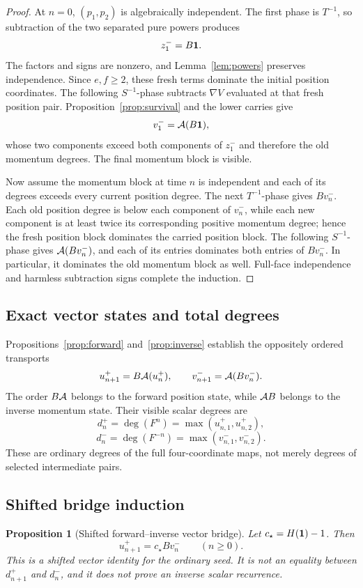 \documentclass[11pt]{article}
\newtheorem{proposition}[theorem]{Proposition}
\theoremstyle{definition}
\theoremstyle{remark}
\begin{document}
\begin{proof}
At \(n=0\), \((p_1,p_2)\) is algebraically independent.  The first
phase is \(T^{-1}\), so subtraction of the two separated pure powers
produces
\[
z^-_1=B\mathbf{1}.
\]
The factors and signs are nonzero, and Lemma~\ref{lem:powers} preserves
independence.  Since \(e,f\geq2\), these fresh terms dominate the initial
position coordinates.  The following \(S^{-1}\)-phase subtracts
\(\nabla V\) evaluated at that fresh position pair.
Proposition~\ref{prop:survival} and the lower carries give
\[
v^-_1=\mathcal{A}(B\mathbf{1}),
\]
whose two components exceed both components of \(z^-_1\) and therefore
the old momentum degrees.  The final momentum block is visible.

Now assume the momentum block at time \(n\) is independent and each of
its degrees exceeds every current position degree.  The next
\(T^{-1}\)-phase gives \(Bv^-_n\).  Each old position degree is below
each component of \(v_n^-\), while each new component is at least twice
its corresponding positive momentum degree; hence the fresh position
block dominates the carried position block.  The following
\(S^{-1}\)-phase gives \(\mathcal{A}(Bv^-_n)\), and each of its entries
dominates both entries of \(Bv^-_n\).  In particular, it dominates the
old momentum block as well.  Full-face independence and harmless
subtraction signs complete the induction.
\end{proof}

\subsection{Exact vector states and total degrees}

Propositions~\ref{prop:forward} and~\ref{prop:inverse} establish the
oppositely ordered transports
\[
u^+_{n+1}=B\mathcal{A}(u^+_n),\qquad
v^-_{n+1}=\mathcal{A}(Bv^-_n).
\]
The order \(B\mathcal{A}\) belongs to the forward position state, while
\(\mathcal{A} B\) belongs to the inverse momentum state.  Their visible scalar
degrees are
\[
d_n^+=\deg(F^n)=\max(u^+_{n,1},u^+_{n,2}),
\]
\[
d_n^-=\deg(F^{-n})=\max(v^-_{n,1},v^-_{n,2}).
\]
These are ordinary degrees of the full four-coordinate maps, not merely
degrees of selected intermediate pairs.

\subsection{Shifted bridge induction}

\begin{proposition}[Shifted forward--inverse vector bridge]
\label{prop:bridge}
Let \(c_\star=H(\mathbf{1})-1\).  Then
\[
u^+_{n+1}=c_\star Bv^-_n\qquad(n\geq0).
\]
This is a shifted vector identity for the ordinary seed.  It is not an
equality between \(d_{n+1}^+\) and \(d_n^-\), and it does not prove an
inverse scalar recurrence.
\end{proposition}
\end{document}

